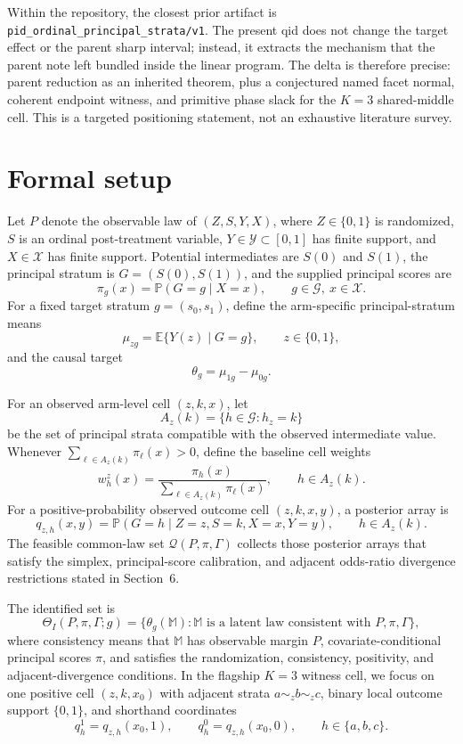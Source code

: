 \documentclass[11pt]{article}
\newcommand{\E}{\mathbb{E}}
\renewcommand{\Pr}{\mathbb{P}}
\theoremstyle{definition}
\theoremstyle{plain}
\theoremstyle{remark}
\begin{document}
Within the repository, the closest prior artifact is \texttt{pid\_ordinal\_principal\_strata/v1}.  The present qid does not change the target effect or the parent sharp interval; instead, it extracts the mechanism that the parent note left bundled inside the linear program.  The delta is therefore precise: parent reduction as an inherited theorem, plus a conjectured named facet normal, coherent endpoint witness, and primitive phase slack for the \(K=3\) shared-middle cell.  This is a targeted positioning statement, not an exhaustive literature survey.

\section{Formal setup}
Let \(P\) denote the observable law of \((Z,S,Y,X)\), where \(Z\in\{0,1\}\) is randomized, \(S\) is an ordinal post-treatment variable, \(Y\in\mathcal Y\subset[0,1]\) has finite support, and \(X\in\mathcal X\) has finite support.  Potential intermediates are \(S(0)\) and \(S(1)\), the principal stratum is \(G=(S(0),S(1))\), and the supplied principal scores are
\[
  \pi_g(x)=\Pr(G=g\mid X=x),\qquad g\in\mathcal G,\ x\in\mathcal X.
\]
For a fixed target stratum \(g=(s_0,s_1)\), define the arm-specific principal-stratum means
\[
  \mu_{zg}=\E\{Y(z)\mid G=g\},\qquad z\in\{0,1\},
\]
and the causal target
\[
  \theta_g=\mu_{1g}-\mu_{0g}.
\]

For an observed arm-level cell \((z,k,x)\), let
\[
  A_z(k)=\{h\in\mathcal G:h_z=k\}
\]
be the set of principal strata compatible with the observed intermediate value.  Whenever \(\sum_{\ell\in A_z(k)}\pi_\ell(x)>0\), define the baseline cell weights
\[
  w_h^z(x)=\frac{\pi_h(x)}{\sum_{\ell\in A_z(k)}\pi_\ell(x)},\qquad h\in A_z(k).
\]
For a positive-probability observed outcome cell \((z,k,x,y)\), a posterior array is
\[
  q_{z,h}(x,y)=\Pr(G=h\mid Z=z,S=k,X=x,Y=y),\qquad h\in A_z(k).
\]
The feasible common-law set \(\mathcal Q(P,\pi,\Gamma)\) collects those posterior arrays that satisfy the simplex, principal-score calibration, and adjacent odds-ratio divergence restrictions stated in Section~6.

The identified set is
\[
  \Theta_I(P,\pi,\Gamma;g)
  =
  \{\theta_g(\mathbb M): \mathbb M \text{ is a latent law consistent with } P,\pi,\Gamma\},
\]
where consistency means that \(\mathbb M\) has observable margin \(P\), covariate-conditional principal scores \(\pi\), and satisfies the randomization, consistency, positivity, and adjacent-divergence conditions.  In the flagship \(K=3\) witness cell, we focus on one positive cell \((z,k,x_0)\) with adjacent strata \(a\sim_z b\sim_z c\), binary local outcome support \(\{0,1\}\), and shorthand coordinates
\[
  q_h^1=q_{z,h}(x_0,1),\qquad q_h^0=q_{z,h}(x_0,0),\qquad h\in\{a,b,c\}.
\]
\end{document}

